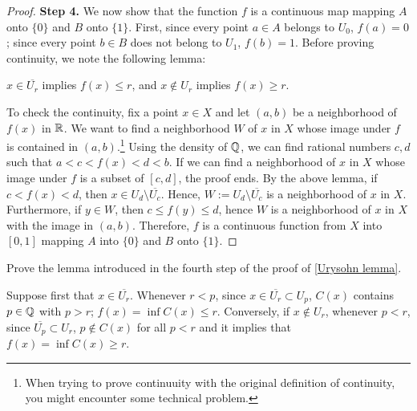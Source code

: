 \begin{proof}
    \textbf{Step 4.}
    We now show that the function $f$ is a continuous map mapping $A$ onto $\{0\}$ and $B$ onto $\{1\}$.
    First, since every point $a\in A$ belongs to $U_0$, $f(a)=0$; since every point $b\in B$ does not belong to $U_1$, $f(b)=1$.
    Before proving continuity, we note the following lemma:
    \begin{center}
        $x\in\overline{U_r}$ implies $f(x)\leq r$, and $x\notin U_r$ implies $f(x)\geq r$.
    \end{center}
    To check the continuity, fix a point $x\in X$ and let $(a, b)$ be a neighborhood of $f(x)$ in ${\mathbb{R}}$.
    We want to find a neighborhood $W$ of $x$ in $X$ whose image under $f$ is contained in $(a, b)$.\footnote{When trying to prove continuuity with the original definition of continuity, you might encounter some technical problem.}
    Using the density of ${\mathbb{Q}}$, we can find rational numbers $c, d$ such that $a<c<f(x)<d<b$.
    If we can find a neighborhood of $x$ in $X$ whose image under $f$ is a subset of $[c, d]$, the proof ends.
    By the above lemma, if $c<f(x)<d$, then $x\in U_d\setminus\overline{U_c}$.
    Hence, $W:=U_d\setminus\overline{U_c}$ is a neighborhood of $x$ in $X$.
    Furthermore, if $y\in W$, then $c\leq f(y)\leq d$, hence $W$ is a neighborhood of $x$ in $X$ with the image in $(a, b)$.
    Therefore, $f$ is a continuous function from $X$ into $[0, 1]$ mapping $A$ into $\{0\}$ and $B$ onto $\{1\}$.
\end{proof}
\begin{prob}
    Prove the lemma introduced in the fourth step of the proof of \cref{Urysohn lemma}.
\end{prob}
\begin{sol}
    Suppose first that $x\in\overline{U_r}$.
    Whenever $r<p$, since $x\in\overline{U_r}\subset U_p$, $C(x)$ contains $p\in{\mathbb{Q}}$ with $p>r$; $f(x)=\inf C(x)\leq r$.
    Conversely, if $x\notin U_r$, whenever $p<r$, since $\overline{U_p}\subset U_r$, $p\notin C(x)$ for all $p<r$ and it implies that $f(x)=\inf C(x)\geq r$.
\end{sol}

